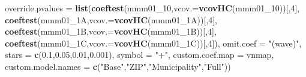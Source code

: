 \documentclass[
]{article}
\newenvironment{Shaded}{\begin{snugshade}}{\end{snugshade}}
\newcommand{\DataTypeTok}[1]{\textcolor[rgb]{0.13,0.29,0.53}{#1}}
\newcommand{\DecValTok}[1]{\textcolor[rgb]{0.00,0.00,0.81}{#1}}
\newcommand{\FloatTok}[1]{\textcolor[rgb]{0.00,0.00,0.81}{#1}}
\newcommand{\KeywordTok}[1]{\textcolor[rgb]{0.13,0.29,0.53}{\textbf{#1}}}
\newcommand{\NormalTok}[1]{#1}
\newcommand{\StringTok}[1]{\textcolor[rgb]{0.31,0.60,0.02}{#1}}
\begin{document}
\begin{Shaded}
\begin{Highlighting}[]
          \DataTypeTok{override.pvalues =} \KeywordTok{list}\NormalTok{(}\KeywordTok{coeftest}\NormalTok{(mmm01_}\DecValTok{10}\NormalTok{,}\DataTypeTok{vcov.=}\KeywordTok{vcovHC}\NormalTok{(mmm01_}\DecValTok{10}\NormalTok{))[,}\DecValTok{4}\NormalTok{],}
                                  \KeywordTok{coeftest}\NormalTok{(mmm01_1A,}\DataTypeTok{vcov.=}\KeywordTok{vcovHC}\NormalTok{(mmm01_1A))[,}\DecValTok{4}\NormalTok{],}
                                  \KeywordTok{coeftest}\NormalTok{(mmm01_1B,}\DataTypeTok{vcov.=}\KeywordTok{vcovHC}\NormalTok{(mmm01_1B))[,}\DecValTok{4}\NormalTok{],}
                                  \KeywordTok{coeftest}\NormalTok{(mmm01_1C,}\DataTypeTok{vcov.=}\KeywordTok{vcovHC}\NormalTok{(mmm01_1C))[,}\DecValTok{4}\NormalTok{]),}
          \DataTypeTok{omit.coef =} \StringTok{"(wave)"}\NormalTok{, }\DataTypeTok{stars =} \KeywordTok{c}\NormalTok{(}\FloatTok{0.1}\NormalTok{,}\FloatTok{0.05}\NormalTok{,}\FloatTok{0.01}\NormalTok{,}\FloatTok{0.001}\NormalTok{), }\DataTypeTok{symbol =} \StringTok{"+"}\NormalTok{,}
          \DataTypeTok{custom.coef.map =}\NormalTok{ vnmap, }
          \DataTypeTok{custom.model.names =} \KeywordTok{c}\NormalTok{(}\StringTok{"Base"}\NormalTok{,}\StringTok{"ZIP"}\NormalTok{,}\StringTok{"Municipality"}\NormalTok{,}\StringTok{"Full"}\NormalTok{))}
\end{Highlighting}
\end{Shaded}
\end{document}
